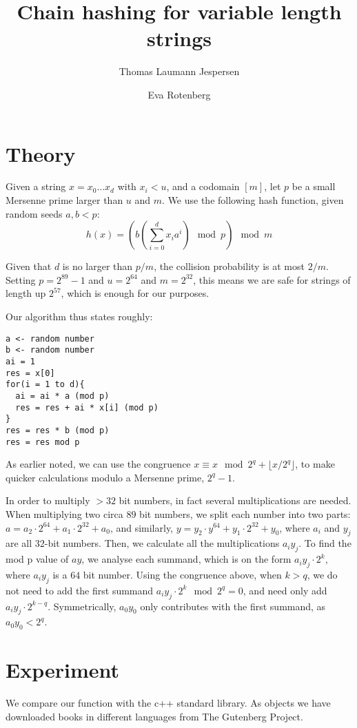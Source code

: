 \documentclass[]{article}
\title{Chain hashing for variable length strings}
\author{Thomas Laumann Jespersen \and Eva Rotenberg}
\begin{document}
\maketitle

\section{Theory}

Given a string $x=x_0 \ldots x_d$ with $x_i < u$, and a codomain $[m]$, let $p$ be a small Mersenne prime larger than $u$ and $m$. We use the following hash function, given random seeds $a,b < p$:
\[h(x)= \left( b \left( \sum_{i=0}^{d}x_i a^i \right) \mod p \right) \mod m \]

Given that $d$ is no larger than $p/m$, the collision probability is at most $2/m$. Setting $p=2^{89}-1$ and $u=2^{64}$ and $m=2^{32}$, this means we are safe for strings of length up $2^{57}$, which is enough for our purposes.

Our algorithm thus states roughly:

\begin{verbatim}
a <- random number
b <- random number
ai = 1
res = x[0]
for(i = 1 to d){
  ai = ai * a (mod p)
  res = res + ai * x[i] (mod p)
}
res = res * b (mod p)
res = res mod p
\end{verbatim}

As earlier noted, we can use the congruence $x \equiv x\mod 2^q + \lfloor x / 2^q \rfloor$, to make quicker calculations modulo a Mersenne prime, $2^q -1$.

In order to multiply $>32$ bit numbers, in fact several multiplications are needed. When multiplying two circa $89$ bit numbers, we split each number into two parts: $a = a_2\cdot 2^{64} + a_1 \cdot 2^{32} + a_0$, and similarly, $y = y_2\cdot y^{64} + y_1 \cdot 2^{32} + y_0$, where $a_i$ and $y_j$ are all $32$-bit numbers. Then, we calculate all the multiplications $a_i y_j$. To find the mod p value of $ay$, we analyse each summand, which is on the form $a_i y_j \cdot 2^{k}$, where $a_i y_j$ is a $64$ bit number. Using the congruence above, when $k>q$, we do not need to add the first summand $a_i y_j \cdot 2^k \mod 2^q = 0$, and need only add $a_i y_j \cdot 2^{k-q}$. Symmetrically, $a_0 y_0$ only contributes with the first summand, as $a_0 y_0 < 2^q$.

\section{Experiment}
We compare our function with the c++ standard library. As objects we have downloaded books in different languages from The Gutenberg Project. 
\end{document}
